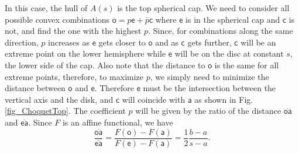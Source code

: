 \documentclass[10pt,twocolumn, nofootinbib]{revtex4-2}
\newcommand{\ens}[1][e] {\mathsf{#1}} %
\begin{document}
In this case, the hull of $A(s)$ is the top spherical cap. We need to consider all possible convex combinations $\ens[o] = p \ens + \bar{p} \ens[c]$ where $\ens$ is in the spherical cap and $\ens[c]$ is not, and find the one with the highest $p$. Since, for combinations along the same direction, $p$ increases as $\ens$ gets closer to $\ens[o]$ and as $\ens[c]$ gets further, $\ens[c]$ will be an extreme point on the lower hemisphere while $\ens$ will be on the disc at constant $s$, the lower side of the cap. Also note that the distance to $\ens[o]$ is the same for all extreme points, therefore, to maximize $p$, we simply need to minimize the distance between $\ens[o]$ and $\ens$. Therefore $\ens$ must be the intersection between the vertical axis and the disk, and $\ens[c]$ will coincide with $\ens[a]$ as shown in Fig. \ref{fig_ChoquetTop}. The coefficient $p$ will be given by the ratio of the distance $\overline{\ens[o]\ens[a]}$ and $\overline{\ens\ens[a]}$. Since $F$ is an affine functional, we have
\begin{equation}
	\frac{\overline{\ens[o]\ens[a]}}{\overline{\ens\ens[a]}} = \frac{F(\ens[o])-F(\ens[a])}{F(\ens) - F(\ens[a])} = \frac{1}{2} \frac{b - a}{s-a}.
\end{equation}
\end{document}

